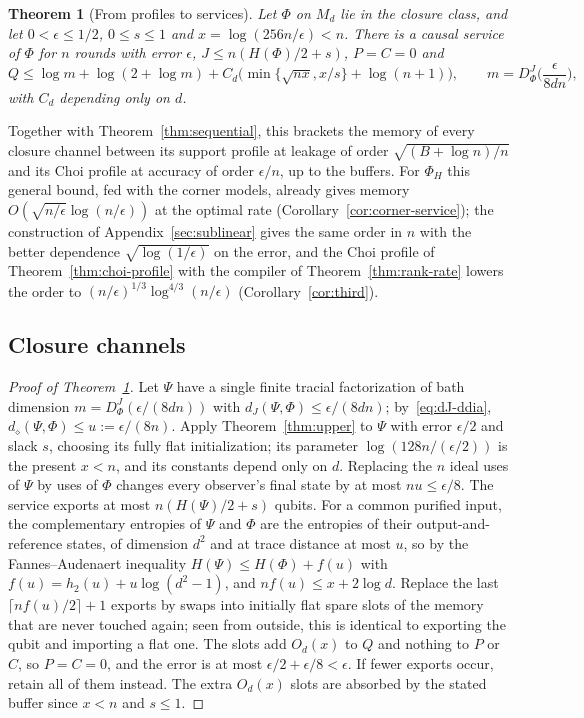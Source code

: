 \documentclass[11pt,a4paper]{article}
\theoremstyle{plain}
\newtheorem{theorem}{Theorem}[section]
\theoremstyle{definition}
\theoremstyle{remark}
\newcommand{\DChoi}{D^{J}}
\newcommand{\dJ}{d_J}
\newcommand{\ddia}{d_\diamond}
\begin{document}
\begin{theorem}[From profiles to services]\label{thm:closure-upper}
Let $\Phi$ on $M_d$ lie in the closure class, and let $0<\epsilon\le1/2$, $0\le s\le1$ and $x=\log(256n/\epsilon)<n$. There is a causal
service of $\Phi$ for $n$ rounds with error $\epsilon$, $J\le n(H(\Phi)/2+s)$, $P=C=0$ and
\[
Q\le\log m+\log(2+\log m)+C_d\big(\min\{\sqrt{nx},x/s\}+\log(n+1)\big),\qquad m=\DChoi_\Phi\Big(\frac{\epsilon}{8dn}\Big),
\]
with $C_d$ depending only on $d$.
\end{theorem}

Together with Theorem~\ref{thm:sequential}, this brackets the memory of every closure channel between its support profile at leakage
of order $\sqrt{(B+\log n)/n}$ and its Choi profile at accuracy of order $\epsilon/n$, up to the buffers. For $\Phi_H$ this general bound,
fed with the corner models, already gives memory $O(\sqrt{n/\epsilon}\log(n/\epsilon))$ at the optimal rate
(Corollary~\ref{cor:corner-service}); the construction of Appendix~\ref{sec:sublinear} gives the same order in $n$ with the better
dependence $\sqrt{\log(1/\epsilon)}$ on the error, and the Choi profile of Theorem~\ref{thm:choi-profile} with the compiler of Theorem~\ref{thm:rank-rate}
lowers the order to $(n/\epsilon)^{1/3}\log^{4/3}(n/\epsilon)$ (Corollary~\ref{cor:third}).


\subsection{Closure channels}

\begin{proof}[Proof of Theorem~\ref{thm:closure-upper}]
Let $\Psi$ have a single finite tracial factorization of bath dimension $m=\DChoi_\Phi(\epsilon/(8dn))$ with
$\dJ(\Psi,\Phi)\le\epsilon/(8dn)$; by~\eqref{eq:dJ-ddia}, $\ddia(\Psi,\Phi)\le u:=\epsilon/(8n)$. Apply Theorem~\ref{thm:upper} to $\Psi$ with
error $\epsilon/2$ and slack $s$, choosing its fully flat initialization; its parameter $\log(128n/(\epsilon/2))$ is the present $x<n$, and its constants depend only on $d$.
Replacing the $n$ ideal uses of $\Psi$ by uses of $\Phi$ changes every observer's final state by at most $nu\le\epsilon/8$. The
service exports at most $n(H(\Psi)/2+s)$ qubits. For a common purified input, the complementary entropies of $\Psi$ and $\Phi$ are
the entropies of their output-and-reference states, of dimension $d^2$ and at trace distance at most $u$, so by the
Fannes--Audenaert inequality $H(\Psi)\le H(\Phi)+f(u)$ with $f(u)=h_2(u)+u\log(d^2-1)$, and $nf(u)\le x+2\log d$. Replace the last
$\lceil nf(u)/2\rceil+1$ exports by swaps into initially flat spare slots of the memory that are never touched again; seen from
outside, this is identical to exporting the qubit and importing a flat one. The slots add $O_d(x)$ to $Q$ and nothing to $P$ or
$C$, so $P=C=0$, and the error is at most $\epsilon/2+\epsilon/8<\epsilon$. If fewer exports occur, retain all of them instead.
The extra $O_d(x)$ slots are absorbed by the stated buffer since $x<n$ and $s\le1$.
\end{proof}
\end{document}
